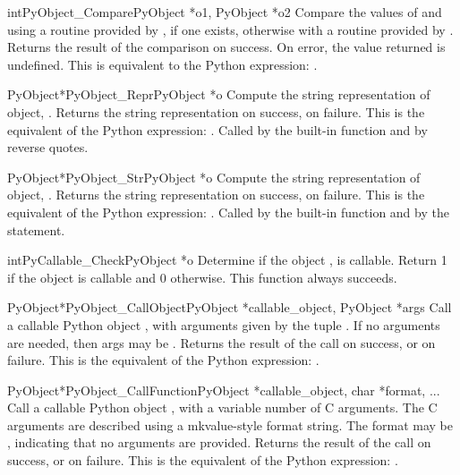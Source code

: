 \begin{cfuncdesc}{int}{PyObject_Compare}{PyObject *o1, PyObject *o2}
Compare the values of  and  using a routine provided by
, if one exists, otherwise with a routine provided by .
Returns the result of the comparison on success.  On error,
the value returned is undefined. This is equivalent to the
Python expression: .
\end{cfuncdesc}


\begin{cfuncdesc}{PyObject*}{PyObject_Repr}{PyObject *o}
Compute the string representation of object, .  Returns the
string representation on success, \NULL{} on failure.  This is
the equivalent of the Python expression: .
Called by the  built-in function and by reverse quotes.
\end{cfuncdesc}


\begin{cfuncdesc}{PyObject*}{PyObject_Str}{PyObject *o}
Compute the string representation of object, .  Returns the
string representation on success, \NULL{} on failure.  This is
the equivalent of the Python expression: .
Called by the  built-in function and by the 
statement.
\end{cfuncdesc}


\begin{cfuncdesc}{int}{PyCallable_Check}{PyObject *o}
Determine if the object , is callable.  Return 1 if the
object is callable and 0 otherwise.
This function always succeeds.
\end{cfuncdesc}


\begin{cfuncdesc}{PyObject*}{PyObject_CallObject}{PyObject *callable_object, PyObject *args}
Call a callable Python object , with
arguments given by the tuple .  If no arguments are
needed, then args may be \NULL{}.  Returns the result of the
call on success, or \NULL{} on failure.  This is the equivalent
of the Python expression: .
\end{cfuncdesc}

\begin{cfuncdesc}{PyObject*}{PyObject_CallFunction}{PyObject *callable_object, char *format, ...}
Call a callable Python object , with a
variable number of C arguments. The C arguments are described
using a mkvalue-style format string. The format may be \NULL{},
indicating that no arguments are provided.  Returns the
result of the call on success, or \NULL{} on failure.  This is
the equivalent of the Python expression: .
\end{cfuncdesc}


